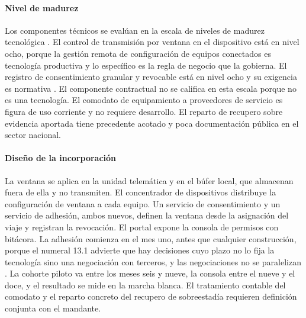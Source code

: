\paragraph{Nivel de madurez} Los componentes técnicos se evalúan en la escala de niveles de madurez
tecnológica \parencite{iso16290}. El control de transmisión por ventana en el dispositivo está en nivel
ocho, porque la gestión remota de configuración de equipos conectados es tecnología productiva y lo
específico es la regla de negocio que la gobierna. El registro de consentimiento granular y revocable
está en nivel ocho y su exigencia es normativa \parencite{ley21719}. El componente contractual no se
califica en esta escala porque no es una tecnología. El comodato de equipamiento a proveedores de
servicio es figura de uso corriente y no requiere desarrollo. El reparto de recupero sobre evidencia
aportada tiene precedente acotado y poca documentación pública en el sector nacional.

\paragraph{Diseño de la incorporación} La ventana se aplica en la unidad telemática y en el búfer
local, que almacenan fuera de ella y no transmiten. El concentrador de dispositivos distribuye la
configuración de ventana a cada equipo. Un servicio de consentimiento y un servicio de adhesión, ambos
nuevos, definen la ventana desde la asignación del viaje y registran la revocación. El portal expone la
consola de permisos con bitácora. La adhesión comienza en el mes uno, antes que cualquier construcción,
porque el numeral 13.1 advierte que hay decisiones cuyo plazo no lo fija la tecnología sino una
negociación con terceros, y las negociaciones no se paralelizan . La cohorte
piloto va entre los meses seis y nueve, la consola entre el nueve y el doce, y el resultado se mide en
la marcha blanca. El tratamiento contable del comodato y el reparto concreto del recupero de
sobreestadía requieren definición conjunta con el mandante.


